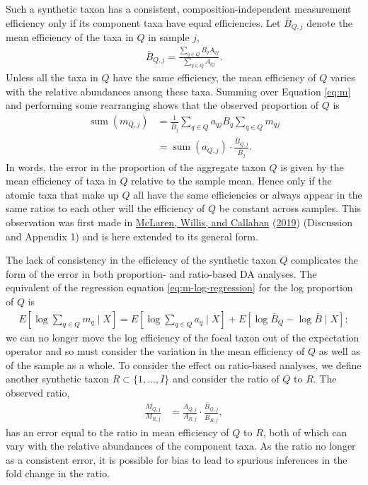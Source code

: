 \documentclass[
]{article}
\theoremstyle{definition}
\theoremstyle{definition}
\theoremstyle{definition}
\theoremstyle{definition}
\theoremstyle{remark}
\begin{document}
Such a synthetic taxon has a consistent, composition-independent measurement efficiency only if its component taxa have equal efficiencies.
Let \(\bar B_{Q,j}\) denote the mean efficiency of the taxa in \(Q\) in sample \(j\),
\begin{align}
  \label{eq:subset-mean-efficiency}
  \bar B_{Q,j} = \frac{\sum_{q \in Q} B_q A_{qj}}{\sum_{q \in Q} A_{qj}}.
\end{align}
Unless all the taxa in \(Q\) have the same efficiency, the mean efficiency of \(Q\) varies with the relative abundances among these taxa.
Summing over Equation \eqref{eq:m} and performing some rearranging shows that the observed proportion of \(Q\) is
\begin{align}
  \label{eq:sum-m}
  \operatorname{sum}\left(m_{Q,j}\right) 
  &= \frac{1}{\bar B_j} \sum_{q\in Q} a_{qj} B_q \sum_{q\in Q} m_{qj} \\
  &= \operatorname{sum}\left(a_{Q,j}\right) \cdot \frac{\bar B_{Q,j}}{\bar B_j}.
\end{align}
In words, the error in the proportion of the aggregate taxon \(Q\) is given by the mean efficiency of taxa in \(Q\) relative to the sample mean.
Hence only if the atomic taxa that make up \(Q\) all have the same efficiencies or always appear in the same ratios to each other will the efficiency of \(Q\) be constant across samples.
This observation was first made in \protect\hyperlink{ref-mclaren2019cons}{McLaren, Willis, and Callahan} (\protect\hyperlink{ref-mclaren2019cons}{2019}) (Discussion and Appendix 1) and is here extended to its general form.

The lack of consistency in the efficiency of the synthetic taxon \(Q\) complicates the form of the error in both proportion- and ratio-based DA analyses.
The equivalent of the regression equation \eqref{eq:m-log-regression} for the log proportion of \(Q\) is
\begin{align}
  \label{eq:sum-m-log-regression}
  E \left[ \log \sum_{q\in Q} m_{q} \mid X \right] 
  = E \left[ \log \sum_{q\in Q} a_{q} \mid X \right] + E\left[\log \bar B_{Q} - \log \bar B \mid X\right];
\end{align}
we can no longer move the log efficiency of the focal taxon out of the expectation operator and so must consider the variation in the mean efficiency of \(Q\) as well as of the sample as a whole.
To consider the effect on ratio-based analyses, we define another synthetic taxon \(R\subset \{1, \dots, I\}\) and consider the ratio of \(Q\) to \(R\).
The observed ratio,
\begin{align}
  \label{eq:M-ratio-u-v}
  \frac{M_{Q,j}}{M_{R,j}}
  &= \frac{A_{Q,j}}{A_{R,j}} \cdot \frac{\bar B_{Q,j}}{\bar B_{R,j}},
\end{align}
has an error equal to the ratio in mean efficiency of \(Q\) to \(R\), both of which can vary with the relative abundances of the component taxa.
As the ratio no longer as a consistent error, it is possible for bias to lead to spurious inferences in the fold change in the ratio.
\end{document}
